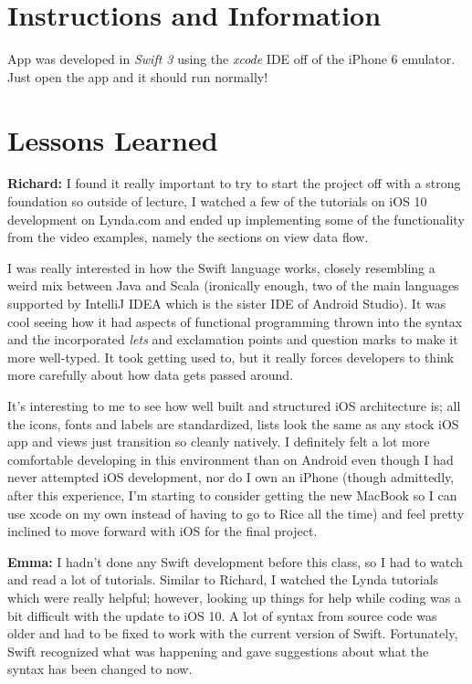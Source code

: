 \documentclass[12pt]{article}
\begin{document}
\maketitle

\section{Instructions and Information}
\noindent App was developed in \textit{Swift 3} using the \textit{xcode} IDE off of the iPhone 6 emulator. Just open the app and it should run normally!

\section{Lessons Learned}
\noindent \textbf{Richard:} I found it really important to try to start the project off with a strong foundation so outside of lecture, I watched a few of the tutorials on iOS 10 development on Lynda.com and ended up implementing some of the functionality from the video examples, namely the sections on view data flow.\break

\noindent I was really interested in how the Swift language works, closely resembling a weird mix between Java and Scala (ironically enough, two of the main languages supported by IntelliJ IDEA which is the sister IDE of Android Studio). It was cool seeing how it had aspects of functional programming thrown into the syntax and the incorporated \textit{lets} and exclamation points and question marks to make it more well-typed. It took getting used to, but it really forces developers to think more carefully about how data gets passed around.\break

\noindent It's interesting to me to see how well built and structured iOS architecture is; all the icons, fonts and labels are standardized, lists look the same as any stock iOS app and views just transition so cleanly natively. I definitely felt a lot more comfortable developing in this environment than on Android even though I had never attempted iOS development, nor do I own an iPhone (though admittedly, after this experience, I'm starting to consider getting the new MacBook so I can use xcode on my own instead of having to go to Rice all the time) and feel pretty inclined to move forward with iOS for the final project.\break

\noindent \textbf{Emma:} I hadn't done any Swift development before this class, so I had to watch and read a lot of tutorials. Similar to Richard, I watched the Lynda tutorials which were really helpful; however, looking up things for help while coding was a bit difficult with the update to iOS 10. A lot of syntax from source code was older and had to be fixed to work with the current version of Swift. Fortunately, Swift recognized what was happening and gave suggestions about what the syntax has been changed to now.\break
\end{document}
